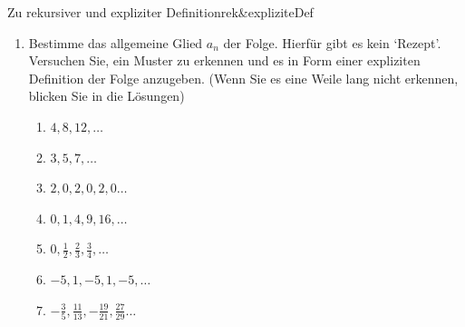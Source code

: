 \begin{ueb}{Zu rekursiver und expliziter Definition}{rek&expliziteDef}
\begin{enumerate}
        \item Bestimme das allgemeine Glied $a_n$ der Folge. Hierfür gibt es kein `Rezept'.
        Versuchen Sie, ein Muster zu erkennen und es in Form einer expliziten Definition der Folge anzugeben. (Wenn Sie es eine Weile lang nicht erkennen, blicken Sie in die Lösungen)
        \begin{enumerate}
            \item $4, 8, 12, \dots$
            \item $3, 5, 7, \dots$
            \item $2, 0, 2, 0, 2, 0\dots$
            
    
            \item $0, 1, 4, 9, 16, \dots$
            \item $0, \frac{1}{2}, \frac{2}{3}, \frac{3}{4}, \dots$
            \item $-5, 1, -5, 1, -5, \dots$
            \item $-\frac{3}{5}, \frac{11}{13}, -\frac{19}{21}, \frac{27}{29} \dots$
        \end{enumerate}
    

\end{enumerate}
\end{ueb}
